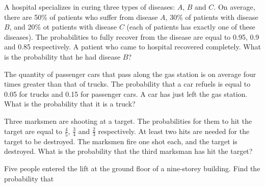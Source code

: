 \documentclass[14pt]{exam}
\begin{document}
\begin{questions}
		
		
		\question
		A hospital specializes in curing three types of diseases: $A$, $B$ and $C$. On average, there are 50\% of patients who suffer from disease $A$, 30\% of patients with disease $B$, and 20\% ot patients with disease $C$ (each of patients has exactly one of these diseases). The probabilities to fully recover from the disease are equal to 0.95, 0.9 and 0.85 respectively. A patient who came to hospital recovered completely. What is the probability that he had disease $B$?

		
		\question
		The quantity of passenger cars that pass along the gas station is on average four times greater than that of trucks. The probability that a car refuels is equal to 0.05 for trucks and 0.15 for passenger cars. A car has just left the gas station. What is the probability that it is a truck?

		\question
		Three marksmen are shooting at a target. The probabilities for them to hit the target are equal to $\frac{4}{5}$, $\frac{3}{4}$ and $\frac{2}{3}$ respectively. At least two hits are needed for the target to be destroyed. The marksmen fire one shot each, and the target is destroyed. What is the probability that the third marksman has hit the target?
		
		\question
		Five people entered the lift at the ground floor of a nine-storey building. Find the probability that
		
		

\end{questions}
\end{document}
